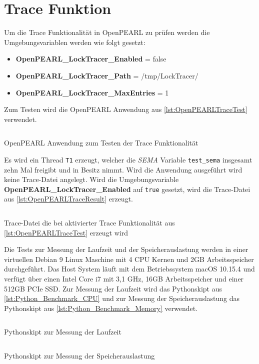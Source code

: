 \section{Trace Funktion}\label{Validierung:Trace Funktion}
\label{section:ValidierungTraceFunktion}
Um die Trace Funktionalität in OpenPEARL zu prüfen werden die Umgebungsvariablen
werden wie folgt gesetzt:
\begin{itemize}
  \item \textbf{OpenPEARL\-\_LockTracer\-\_Enabled} = false
  \item \textbf{OpenPEARL\-\_LockTracer\-\_Path} = /tmp/LockTracer/
  \item \textbf{OpenPEARL\-\_LockTracer\-\_MaxEntries} = 1
\end{itemize}
Zum Testen wird die OpenPEARL Anwendung aus \cref{lst:OpenPEARLTraceTest}
verwendet. 
\begin{listing}[ht]
  \inputminted[frame=lines,linenos]{vim}{./OpenPEARL/TraceTest.prl}
  \caption{OpenPEARL Anwendung zum Testen der Trace Funktionalität}
  \label{lst:OpenPEARLTraceTest}   
\end{listing}
Es wird ein Thread \texttt{T1} erzeugt, welcher die \textit{SEMA} Variable
\texttt{test\_sema} insgesamt zehn Mal freigibt und in Besitz nimmt. Wird die
Anwendung ausgeführt wird keine Trace-Datei angelegt. Wird die Umgebungsvariable
\textbf{OpenPEARL\-\_LockTracer\-\_Enabled} auf \texttt{true} gesetzt, wird die
Trace-Datei aus \cref{lst:OpenPEARLTraceResult} erzeugt.
\begin{listing}[ht]
  \begin{minipage}[ht]{\linewidth}
    \begin{multicols}{2}
      \inputminted[linenos]{text}{./OpenPEARL/TraceTestResult.log}
    \end{multicols}
    \caption{Trace-Datei die bei aktivierter Trace Funktionalität aus \cref{lst:OpenPEARLTraceTest} erzeugt wird}
  \label{lst:OpenPEARLTraceResult}   
  \end{minipage}
\end{listing}

Die Tests zur Messung der Laufzeit und der Speicherauslastung werden in einer
virtuellen Debian 9 Linux Maschine mit 4 CPU Kernen und 2GB Arbeitsspeicher
durchgeführt. Das Host System läuft mit dem Betriebssystem macOS 10.15.4 und
verfügt über einen Intel Core i7 mit 3,1 GHz, 16GB Arbeitsspeicher und einer
512GB PCIe SSD. Zur Messung der Laufzeit wird das Pythonskipt aus
\cref{lst:Python_Benchmark_CPU} und zur Messung der Speicherauslastung das
Pythonskipt aus \cref{lst:Python_Benchmark_Memory} verwendet.
\begin{listing}[ht]
  \inputminted[frame=lines,linenos]{python}{./Python/benchmark_cpu.py}
  \caption{Pythonskipt zur Messung der Laufzeit}
  \label{lst:Python_Benchmark_CPU}   
\end{listing} 
\begin{listing}[ht]
  \inputminted[frame=lines,linenos]{python}{./Python/benchmark_memory.py}
  \caption{Pythonskipt zur Messung der Speicherauslastung}
  \label{lst:Python_Benchmark_Memory}   
\end{listing}

